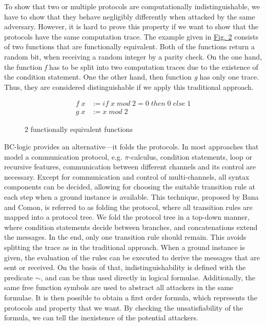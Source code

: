 \documentclass[conference]{IEEEtran}
\begin{document}
To show that two or multiple protocols are computationally indistinguishable, we have to show that they behave negligibly differently when attacked by the same adversary. However, it is hard to prove this property if we want to show that the protocols have the same computation trace. The example given in \hyperref[example]{Fig. 2} consists of two functions that are functionally equivalent. Both of the functions return a random bit, when receiving a random integer by a parity check. On the one hand, the function \textit{f} has to be split into two computation traces due to the existence of the condition statement. One the other hand, then function \textit{g} has only one trace. Thus, they are considered distinguishable if we apply this traditional approach.
\begin{figure}
\begin{align}
    f\; x &:= if\; x\; mod\; 2 = 0\; then\; 0 \; else\; 1 \nonumber \\
    g\; x &:= x\; mod\; 2\nonumber
\end{align}
\caption{2 functionally equivalent functions}
\label{example}
\end{figure}

BC-logic provides an alternative---it folds the protocols. In most approaches that model a communication protocol, e.g. $\pi$-calculus, condition statements, loop or recursive features, communication between different channels and its control are necessary. Except for communication and control of multi-channels, all syntax components can be decided, allowing for choosing the suitable transition rule at each step when a ground instance is available. This technique, proposed by Bana and Comon, is referred to as folding the protocol, where all transition rules are mapped into a protocol tree. We fold the protocol tree in a top-down manner, where condition statements decide between branches, and concatenations extend the messages. In the end, only one transition rule should remain. This avoids splitting the trace as in the traditional approach. When a ground instance is given, the evaluation of the rules can be executed to derive the messages that are sent or received. On the basis of that, indistinguishability is defined with the predicate $\sim$, and can be thus used directly in logical formulae. Additionally, the same free function symbols are used to abstract all attackers in the same formulae. It is then possible to obtain a first order formula, which represents the protocols and property that we want. By checking the unsatisfiability of the formula, we can tell the inexistence of the potential attackers.
\end{document}
